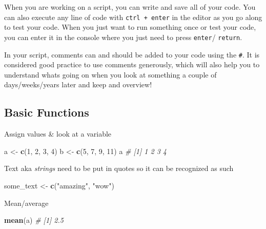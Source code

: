 \documentclass[
]{book}
\newenvironment{Shaded}{\begin{snugshade}}{\end{snugshade}}
\newcommand{\CommentTok}[1]{\textcolor[rgb]{0.56,0.35,0.01}{\textit{#1}}}
\newcommand{\DecValTok}[1]{\textcolor[rgb]{0.00,0.00,0.81}{#1}}
\newcommand{\FunctionTok}[1]{\textcolor[rgb]{0.13,0.29,0.53}{\textbf{#1}}}
\newcommand{\NormalTok}[1]{#1}
\newcommand{\OtherTok}[1]{\textcolor[rgb]{0.56,0.35,0.01}{#1}}
\newcommand{\StringTok}[1]{\textcolor[rgb]{0.31,0.60,0.02}{#1}}
\begin{document}
When you are working on a script, you can write and save all of your code.
You can also execute any line of code with \texttt{ctrl\ +\ enter} in the editor as you go along to test your code.
When you just want to run something once or test your code, you can enter it in the console where you just need to press \texttt{enter}/ \texttt{return}.

In your script, comments can and should be added to your code using the \texttt{\#}.
It is considered good practice to use comments generously, which will also help you to understand whats going on when you look at something a couple of days/weeks/years later and keep and overview!

\subsection*{Basic Functions}\label{basic-functions}

Assign values \& look at a variable

\begin{Shaded}
\begin{Highlighting}[]
\NormalTok{a }\OtherTok{\textless{}{-}} \FunctionTok{c}\NormalTok{(}\DecValTok{1}\NormalTok{, }\DecValTok{2}\NormalTok{, }\DecValTok{3}\NormalTok{, }\DecValTok{4}\NormalTok{)}
\NormalTok{b }\OtherTok{\textless{}{-}} \FunctionTok{c}\NormalTok{(}\DecValTok{5}\NormalTok{, }\DecValTok{7}\NormalTok{, }\DecValTok{9}\NormalTok{, }\DecValTok{11}\NormalTok{)}
\NormalTok{a}
\CommentTok{\# [1] 1 2 3 4}
\end{Highlighting}
\end{Shaded}

Text aka \emph{strings} need to be put in quotes so it can be recognized as such

\begin{Shaded}
\begin{Highlighting}[]
\NormalTok{some\_text }\OtherTok{\textless{}{-}} \FunctionTok{c}\NormalTok{(}\StringTok{"amazing"}\NormalTok{, }\StringTok{"wow"}\NormalTok{)}
\end{Highlighting}
\end{Shaded}

Mean/average

\begin{Shaded}
\begin{Highlighting}[]
\FunctionTok{mean}\NormalTok{(a)}
\CommentTok{\# [1] 2.5}
\end{Highlighting}
\end{Shaded}
\end{document}
